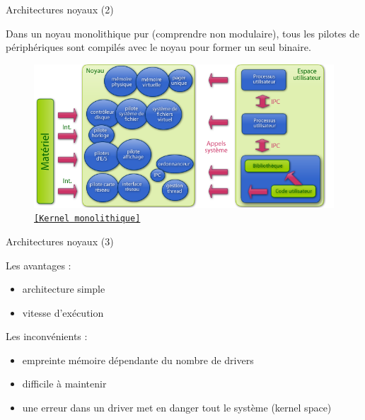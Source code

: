 \documentclass[12pt, t]{beamer}
\newcommand{\bi}{\begin{itemize}}
\newcommand{\ei}{\end{itemize}}
\newcommand{\src}[2]{\vspace{-10pt}\caption{\href{#1}{\centering \tt \tiny [#2]}}}
\begin{document}
\begin{frame}{Architectures noyaux (2)}

    \vspace{10pt}
    Dans un noyau monolithique pur (comprendre non modulaire), tous les pilotes
    de périphériques sont compilés avec le noyau pour former un seul binaire.

    {
        \vspace{5pt}
        \begin{figure}
            \centering
            \includegraphics[scale=0.44]{mono.png}
            \src{https://fr.wikipedia.org/wiki/Noyau\_de\_syst\%C3\%A8me\_d\%27exploitation}{Kernel monolithique}
        \end{figure}
    }

\end{frame}

\begin{frame}{Architectures noyaux (3)}

    \vspace{10pt}
    Les avantages :
    \vspace{5pt}
    \bi
    \itemsep8pt
    \item architecture simple
    \item vitesse d'exécution
    \ei

    {
        \vspace{10pt}
        Les inconvénients :
        \vspace{5pt}
        \bi
        \itemsep8pt
        \item empreinte mémoire dépendante du nombre de drivers
        \item difficile à maintenir
        \item une erreur dans un driver met en danger tout le système (kernel
              space)
        \ei
    }

\end{frame}
\end{document}
